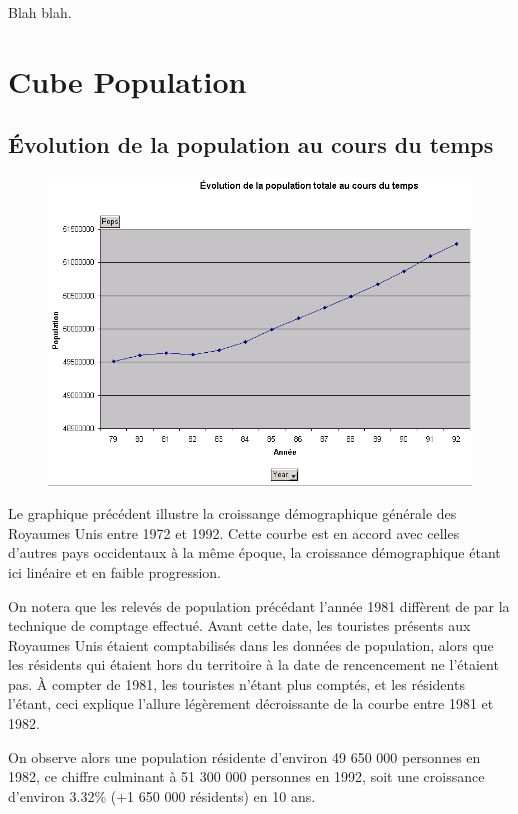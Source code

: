     Blah blah.

\pagebreak


\section{Cube Population}
\subsection{Évolution de la population au cours du temps}
\begin{figure}[h!]
    \centering
    \includegraphics[width=\linewidth]{images/pop/evolutionPopulation.png}
\end{figure}

Le graphique précédent illustre la croissange démographique générale des Royaumes Unis entre 1972 et 1992. Cette courbe est en accord avec celles d'autres pays occidentaux à la même époque, la croissance démographique étant ici linéaire et en faible progression.

On notera que les relevés de population précédant l'année 1981 diffèrent de par la technique de comptage effectué. Avant cette date, les touristes présents aux Royaumes Unis étaient comptabilisés dans les données de population, alors que les résidents qui étaient hors du territoire à la date de rencencement ne l'étaient pas. À compter de 1981, les touristes n'étant plus comptés, et les résidents l'étant, ceci explique l'allure légèrement décroissante de la courbe entre 1981 et 1982.

On observe alors une population résidente d'environ 49 650 000 personnes en 1982, ce chiffre culminant à 51 300 000 personnes en 1992, soit une croissance d'environ 3.32\% (+1 650 000 résidents) en 10 ans.
\pagebreak


